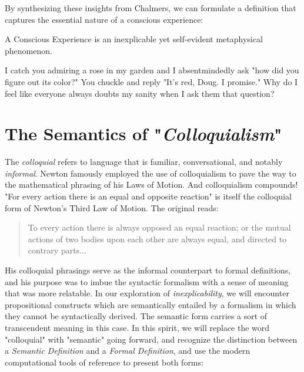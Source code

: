 \documentclass[runningheads]{llncs}
\begin{document}
By synthesizing these insights from Chalmers, we can formulate a definition that captures the essential nature of a conscious experience:

\setcounter{definition}{0}
\begin{cdefinition}
	A Conscious Experience is an inexplicable yet self-evident metaphysical phenomenon.
\end{cdefinition}

\setcounter{definition}{0}
\begin{cexample}
I catch you admiring a rose in my garden and I absentmindedly ask "how did you figure out its color?" You chuckle and reply "It's red, Doug. I promise." Why do I feel like everyone always doubts my sanity when I ask them that question?
\end{cexample}

\section{The Semantics of "\textit{Colloquialism}"}

The \textit{colloquial} refers to language that is familiar, conversational, and notably \textit{informal}. Newton famously employed the use of colloquialism to pave the way to the mathematical phrasing of his Laws of Motion. And colloquialism compounds! "For every action there is an equal and opposite reaction" is itself the colloquial form of Newton's Third Law of Motion. The original reads: 

\begin{quote}
To every action there is always opposed an equal reaction; or the mutual actions of two bodies upon each other are always equal, and directed to contrary parts... \cite{NewtonPrincipia}
\end{quote}

His colloquial phrasings serve as the informal counterpart to formal definitions, and his purpose was to imbue the syntactic formalism with a sense of meaning that was more relatable. In our exploration of \textit{inexplicability}, we will encounter propositional constructs which are semantically entailed by a formalism in which they cannot be syntactically derived. The semantic form carries a sort of transcendent meaning in this case. In this spirit, we will replace the word "colloquial" with "semantic" going forward, and recognize the distinction between a \textit{Semantic Definition} and a \textit{Formal Definition}, and use the modern computational tools of reference to present both forms:
\end{document}
